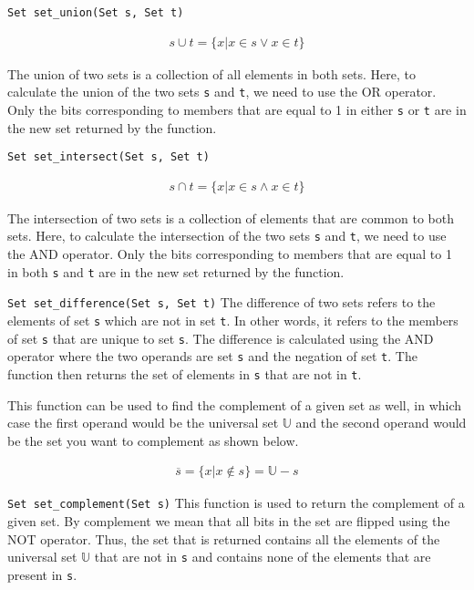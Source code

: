 \begin{funcdoc}{\texttt{Set set\_union(Set s, Set t)}}

\begin{align*}
  s \cup t = \{x | x \in s \lor x \in  t\}
\end{align*}

  \noindent The union of two sets is a collection of all elements in
  both sets. Here, to calculate the union of the two sets \texttt{s} and
  \texttt{t}, we need to use the OR operator. Only the bits
  corresponding to members that are equal to 1 in either \texttt{s} or
  \texttt{t} are in the new set returned by the function.
\end{funcdoc}

\begin{funcdoc}{\texttt{Set set\_intersect(Set s, Set t)}}

\begin{align*}
  s \cap t = \{x | x \in s \land x \in  t\}
\end{align*}

  \noindent The intersection of two sets is a collection of elements that
  are common to both sets. Here, to calculate the intersection of the
  two sets \texttt{s} and \texttt{t}, we need to use the AND operator.
  Only the bits corresponding to members that are equal to 1 in both
  \texttt{s} and \texttt{t} are in the new set returned by the function.
\end{funcdoc}

\begin{funcdoc}{\texttt{Set set\_difference(Set s, Set t)}}
  The difference of two sets refers to the elements of set \texttt{s}
  which are not in set \texttt{t}. In other words, it refers to the
  members of set \texttt{s} that are unique to set \texttt{s}. The
  difference is calculated using the AND operator where the two operands
  are set \texttt{s} and the negation of set \texttt{t}. The function
  then returns the set of elements in \texttt{s} that are not in
  \texttt{t}.

  This function can be used to find the complement of a given set as well,
  in which case the first operand would be the universal set $\mathbb{U}$
  and the second operand would be the set you want to complement as shown
  below.
\end{funcdoc}

\begin{align*}
  \overline{s} = \{ x | x \notin s\} = \mathbb{U} -s
\end{align*}

\begin{funcdoc}{\texttt{Set set\_complement(Set s)}}
  This function is used to return the complement of a given set. By
  complement we mean that all bits in the set are flipped using the NOT
  operator. Thus, the set that is returned contains all the elements of
  the universal set $\mathbb{U}$ that are not in \texttt{s} and contains
  none of the elements that are present in \texttt{s}.
\end{funcdoc}
